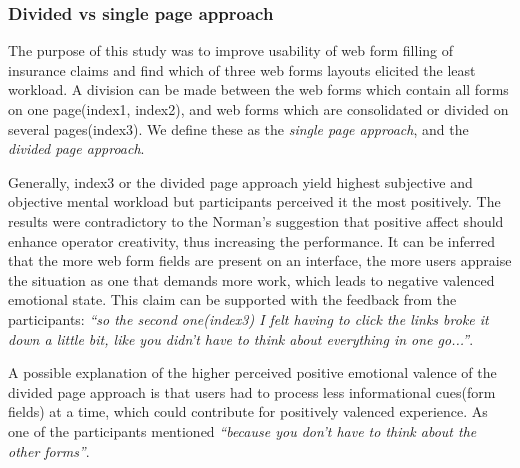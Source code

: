 \documentclass[../main/Replicate.tex]{subfiles}
\begin{document}
%	
	
	\subsubsection{Divided vs single page approach}
	The purpose of this study was to improve usability of web form filling of insurance claims and find which of three web forms layouts elicited the least workload. A division can be made between the web forms which contain all forms on one page(index1, index2), and web forms which are consolidated or divided on several pages(index3). We define these as the \textit{single page approach}, and the \textit{divided page approach}.
	
	Generally, index3 or the divided page approach yield highest subjective and objective mental workload but participants perceived it the most positively. The results were contradictory to the Norman's \cite{norman2002emotion} suggestion that positive affect should enhance operator creativity, thus increasing the performance. It can be inferred that the more web form fields are present on an interface, the more users appraise the situation as one that demands more work, which leads to negative valenced emotional state. This claim can be supported with the feedback from the participants: \textit{``so the second one(index3) I felt having to click the links broke it down a little bit, like you didn't have to think about everything in one go...''}. 
	
	A possible explanation of the higher perceived positive emotional valence of the divided page approach is that users had to process less informational cues(form fields) at a time, which could contribute for positively valenced experience. As one of the participants mentioned \textit{``because you don't have to think about the other forms''}. 
	
\end{document}
